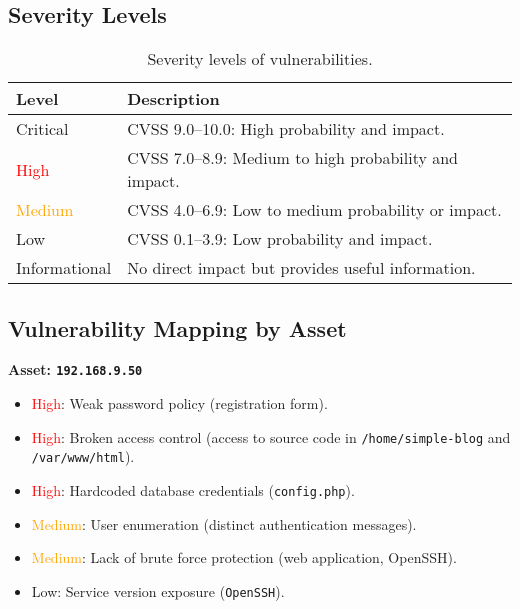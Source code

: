 \documentclass[a4paper,12pt]{article}
\begin{document}
\subsection{Severity Levels}
\begin{table}[ht]
    \centering
    \begin{tabular}{lp{10cm}}
        \toprule
        \rowcolor{gray!20} \textbf{Level} & \textbf{Description} \\
        \midrule
        \textcolor{BrickRed}{Critical} & CVSS 9.0–10.0: High probability and impact. \\
        \textcolor{Red}{High} & CVSS 7.0–8.9: Medium to high probability and impact. \\
        \textcolor{Orange}{Medium} & CVSS 4.0–6.9: Low to medium probability or impact. \\
        \textcolor{NavyBlue}{Low} & CVSS 0.1–3.9: Low probability and impact. \\
        \textcolor{Periwinkle}{Informational} & No direct impact but provides useful information. \\
        \bottomrule
    \end{tabular}
    \caption{Severity levels of vulnerabilities.}
\end{table}

\subsection{Vulnerability Mapping by Asset}

\textbf{Asset: \texttt{192.168.9.50}}  
\begin{itemize}
    \item \textcolor{Red}{High}: Weak password policy (registration form).  
    \item \textcolor{Red}{High}: Broken access control (access to source code in \texttt{/home/simple-blog} and \texttt{/var/www/html}).  
    \item \textcolor{Red}{High}: Hardcoded database credentials (\texttt{config.php}).  
    \item \textcolor{Orange}{Medium}: User enumeration (distinct authentication messages).  
    \item \textcolor{Orange}{Medium}: Lack of brute force protection (web application, OpenSSH).  
    \item \textcolor{NavyBlue}{Low}: Service version exposure (\texttt{OpenSSH}).  
\end{itemize}
\end{document}
